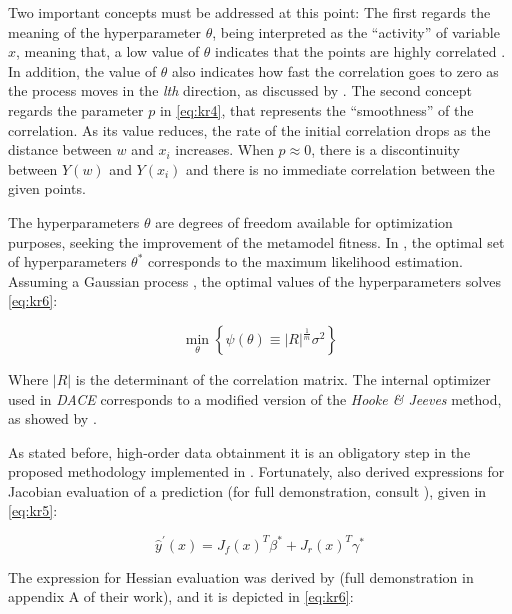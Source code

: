 \documentclass[../msc-thesis.tex]{subfiles}
\begin{document}
Two important concepts must be addressed at this point: The first regards the 
meaning of the hyperparameter $\theta$, being interpreted as the ``activity'' 
of variable $x$, meaning that, a low value of $\theta$ indicates that the 
points are highly correlated \cite{Alves2018}. In addition, the value of 
$\theta$ also indicates how fast the correlation goes to zero as the 
process moves in the \textit{lth} direction, as discussed by 
\textcite{Caballero2008}. The second concept regards the parameter $p$ in 
\autoref{eq:kr4}, that represents the ``smoothness'' of the correlation. As 
its value reduces, the rate of the initial correlation drops as the distance 
between $w$ and $x_i$ increases. When $p \approx 0$, there is a 
discontinuity between $Y(w)$ and $Y\left(x_{i}\right)$ \cite{Forrester2008} 
and there is no immediate correlation between the given points.

The hyperparameters $\theta$ are degrees of freedom available for optimization 
purposes, seeking the improvement of the metamodel fitness. In 
\textcite{Lophaven2002}, the optimal set of hyperparameters $\theta^*$ 
corresponds to the maximum likelihood estimation. Assuming a Gaussian process 
\cite{Lophaven2002}, the optimal values of the hyperparameters solves 
\autoref{eq:kr6}:

\begin{equation}
    \min _{\theta}\left\{\psi(\theta) \equiv|R|^{\frac{1}{m}} 
    \sigma^{2}\right\}
	\label{eq:kr6}
\end{equation}

Where $|R|$ is the determinant of the correlation matrix. The internal 
optimizer used in \textit{DACE} corresponds to a modified version of 
the \textit{Hooke \& Jeeves} method, as showed by \textcite{LophavenReport}.

As stated before, high-order data obtainment it is an obligatory step in the 
proposed methodology implemented in \mtc. Fortunately, \textcite{Lophaven2002} 
also derived expressions for Jacobian evaluation of a \kriging prediction 
(for full demonstration, consult \textcite{Lophaven2002}), given in 
\autoref{eq:kr5}:

\begin{equation}
	\hat{y}^{\prime}(x)=J_{f}(x)^{T} \beta^{*}+J_{r}(x)^{T} \gamma^{*}
	\label{eq:kr5}
\end{equation}	

The expression for Hessian evaluation was derived by \textcite{Alves2018} 
(full demonstration in appendix A of their work), and it is depicted in 
\autoref{eq:kr6}:
\end{document}
